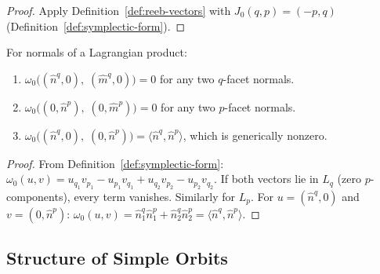 \begin{proof}
Apply Definition~\ref{def:reeb-vectors} with
$J_0(q, p) = (-p, q)$
(Definition~\ref{def:symplectic-form}).
\end{proof}

\begin{lemma}\label{lem:omega-vanishes}
For normals of a Lagrangian product:
\begin{enumerate}
\item $\omega_0\bigl((\hat{n}^q, 0),\; (\hat{m}^q, 0)\bigr) = 0$
  for any two $q$-facet normals.
\item $\omega_0\bigl((0, \hat{n}^p),\; (0, \hat{m}^p)\bigr) = 0$
  for any two $p$-facet normals.
\item $\omega_0\bigl((\hat{n}^q, 0),\; (0, \hat{n}^p)\bigr)
  = \langle \hat{n}^q, \hat{n}^p \rangle$,
  which is generically nonzero.
\end{enumerate}
\end{lemma}

\begin{proof}
From Definition~\ref{def:symplectic-form}:
$\omega_0(u, v) = u_{q_1} v_{p_1} - u_{p_1} v_{q_1} + u_{q_2} v_{p_2} - u_{p_2} v_{q_2}$.
If both vectors lie in $L_q$ (zero $p$-components), every term vanishes.
Similarly for $L_p$.
For $u = (\hat{n}^q, 0)$ and $v = (0, \hat{n}^p)$:
$\omega_0(u, v) = \hat{n}^q_1 \hat{n}^p_1 + \hat{n}^q_2 \hat{n}^p_2
= \langle \hat{n}^q, \hat{n}^p \rangle$.
\end{proof}

\subsection{Structure of Simple Orbits}\label{subsec:orbit-structure}

